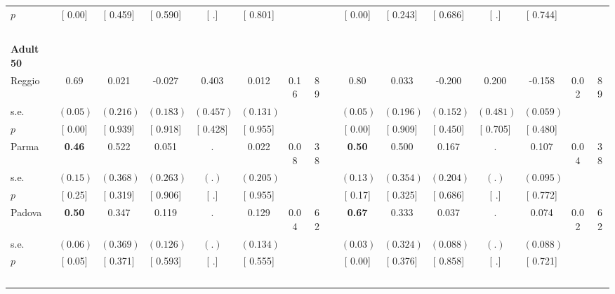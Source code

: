 \begin{longtable}{L{8em} c c c c c c c p{1em} c c c c c c c}
\quad \quad \quad \quad $ p$ & [     0.00] & [    0.459] & [    0.590] & [        .] & [    0.801] & & & & [     0.00] & [    0.243] & [    0.686] & [        .] & [    0.744] & &  \\[1em]
~\\[1em]
\quad \quad \textbf{Adult 50} & & & & & & & & & & & & & & & \\* 
\quad \quad \quad Reggio& 0.69 &     0.021 &    -0.027 &     0.403 &     0.012 &      0.16 &        89 & & 0.80 &     0.033 &    -0.200 &     0.200 &    -0.158 &      0.02 &        89  \\*
\quad \quad \quad \quad s.e.& $ (     0.05)$ & $ (    0.216)$ & $ (    0.183)$ & $ (    0.457)$ & $ (    0.131)$ & & & & $ (     0.05)$ & $ (    0.196)$ & $ (    0.152)$ & $ (    0.481)$ & $ (    0.059)$ & &  \\*
\quad \quad \quad \quad $ p$ & [     0.00] & [    0.939] & [    0.918] & [    0.428] & [    0.955] & & & & [     0.00] & [    0.909] & [    0.450] & [    0.705] & [    0.480] & &  \\[1em]
\quad \quad \quad Parma& \textbf{     0.46} &     0.522 &     0.051 &         . &     0.022 &      0.08 &        38 & & \textbf{     0.50} &     0.500 &     0.167 &         . &     0.107 &      0.04 &        38  \\*
\quad \quad \quad \quad s.e.& $ (     0.15)$ & $ (    0.368)$ & $ (    0.263)$ & $ (        .)$ & $ (    0.205)$ & & & & $ (     0.13)$ & $ (    0.354)$ & $ (    0.204)$ & $ (        .)$ & $ (    0.095)$ & &  \\*
\quad \quad \quad \quad $ p$ & [     0.25] & [    0.319] & [    0.906] & [        .] & [    0.955] & & & & [     0.17] & [    0.325] & [    0.686] & [        .] & [    0.772] & &  \\[1em]
\quad \quad \quad Padova& \textbf{     0.50} &     0.347 &     0.119 &         . &     0.129 &      0.04 &        62 & & \textbf{     0.67} &     0.333 &     0.037 &         . &     0.074 &      0.02 &        62  \\*
\quad \quad \quad \quad s.e.& $ (     0.06)$ & $ (    0.369)$ & $ (    0.126)$ & $ (        .)$ & $ (    0.134)$ & & & & $ (     0.03)$ & $ (    0.324)$ & $ (    0.088)$ & $ (        .)$ & $ (    0.088)$ & &  \\*
\quad \quad \quad \quad $ p$ & [     0.05] & [    0.371] & [    0.593] & [        .] & [    0.555] & & & & [     0.00] & [    0.376] & [    0.858] & [        .] & [    0.721] & &  \\[1em]
~\\[1em]

\end{longtable}
